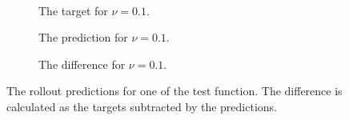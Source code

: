 \documentclass[preprint,12pt,times,authoryear]{elsarticle}
\begin{document}
\begin{figure}[hbp]
\begin{adjustwidth}{-0.1\linewidth}{-0.1\linewidth}
\begin{subfigure}{0.32\linewidth}
    \end{subfigure}
    \\[0.7\baselineskip]
    \begin{subfigure}{0.33\linewidth}
      \begin{adjustbox}{width=\linewidth}
        
      \end{adjustbox}
      \caption{The target for \(\nu=0.1\).}\label{fig:sc2_rollout_target_0.1}
    \end{subfigure}
    \begin{subfigure}{0.33\linewidth}
      \begin{adjustbox}{width=\linewidth}
        
      \end{adjustbox}
      \caption{The prediction for \(\nu=0.1\).}\label{fig:sc2_rollout_pred_0.1}
    \end{subfigure}
    \begin{subfigure}{0.32\linewidth}
      \begin{adjustbox}{width=\linewidth}
        
      \end{adjustbox}
      \caption{The difference for \(\nu=0.1\).}\label{fig:sc2_rollout_diff_0.1}
    \end{subfigure}
  \end{adjustwidth}
  \caption{The rollout predictions for one of the test function. The difference is calculated as the targets subtracted by the predictions.}\label{fig:scenario_2_rollout}
\end{figure}
\end{document}
